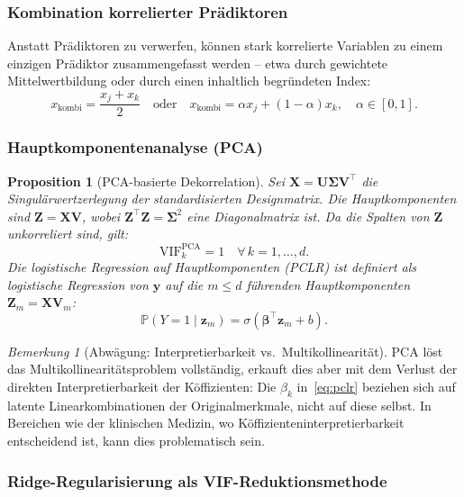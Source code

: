 ﻿\documentclass[12pt, a4paper]{article}
\newtheorem{proposition}[theorem]{Proposition}
\theoremstyle{definition}
\theoremstyle{remark}
\newtheorem{remark}[theorem]{Bemerkung}
\newcommand{\Prob}{\mathbb{P}}
\newcommand{\sigmoid}{\sigma}
\newcommand{\vy}{\bm{y}}
\newcommand{\vX}{\bm{X}}
\newcommand{\vz}{\bm{z}}
\newcommand{\T}{\top}
\begin{document}
\subsubsection{Kombination korrelierter Prädiktoren}

Anstatt Prädiktoren zu verwerfen, können stark korrelierte Variablen zu einem einzigen
Prädiktor zusammengefasst werden -- etwa durch gewichtete Mittelwertbildung oder durch
einen inhaltlich begründeten Index:
\[
x_{\mathrm{kombi}} = \frac{x_j + x_k}{2} \quad \text{oder} \quad x_{\mathrm{kombi}} = \alpha x_j + (1-\alpha)x_k, \quad \alpha \in [0,1].
\]

\subsubsection{Hauptkomponentenanalyse (PCA)}

\begin{proposition}[PCA-basierte Dekorrelation]
	Sei $\vX = \bm{U}\bm{\Sigma}\bm{V}^\T$ die Singulärwertzerlegung der standardisierten
	Designmatrix. Die Hauptkomponenten sind $\bm{Z} = \vX\bm{V}$, wobei $\bm{Z}^\T\bm{Z} = \bm{\Sigma}^2$
	eine Diagonalmatrix ist. Da die Spalten von $\bm{Z}$ unkorreliert sind, gilt:
	\[
	\mathrm{VIF}_k^{\mathrm{PCA}} = 1 \quad \forall\, k = 1, \ldots, d.
	\]
	Die \emph{logistische Regression auf Hauptkomponenten} (PCLR) ist definiert als logistische
	Regression von $\vy$ auf die $m \leq d$ führenden Hauptkomponenten $\bm{Z}_m = \vX\bm{V}_m$:
	\begin{equation}
		\Prob(Y=1 \mid \vz_m) = \sigmoid(\bm{\beta}^\T\vz_m + b).
		\label{eq:pclr}
	\end{equation}
\end{proposition}

\begin{remark}[Abwägung: Interpretierbarkeit vs.\ Multikollinearität]
	PCA löst das Multikollinearitätsproblem vollständig, erkauft dies aber mit dem Verlust
	der direkten Interpretierbarkeit der Köffizienten: Die $\beta_k$ in~\eqref{eq:pclr}
	beziehen sich auf latente Linearkombinationen der Originalmerkmale, nicht auf diese selbst.
	In Bereichen wie der klinischen Medizin, wo Köffizienteninterpretierbarkeit entscheidend ist,
	kann dies problematisch sein.
\end{remark}

\subsubsection{Ridge-Regularisierung als VIF-Reduktionsmethode}
\end{document}
